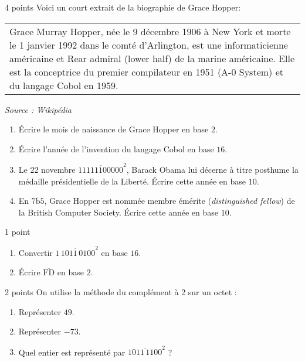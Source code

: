 \documentclass[a4paper,dvipsnames]{article}
\begin{document}
\begin{exercice}{4 points}{}
  Voici un court extrait de la biographie de Grace Hopper:

  \begin{center}
    \begin{tabular}{|p{12cm}}
      Grace Murray Hopper, née le 9 décembre 1906 à New York et morte le 1\ier{} janvier 1992 dans le comté d'Arlington, est une informaticienne américaine et Rear admiral (lower half) de la marine américaine. Elle est la conceptrice du premier compilateur en 1951 (A-0 System) et du langage Cobol en 1959.
    \end{tabular}

    \smallskip

    \begin{minipage}{12cm}
      \flushright\textit{Source : Wikipédia}
    \end{minipage}
  \end{center}

  \begin{enumerate}
    \item Écrire le mois de naissance de Grace Hopper en base $2$.
    \item Écrire l'année de l'invention du langage Cobol en base $16$.
    \item Le 22 novembre $\overline{11111100000}^2$, Barack Obama lui décerne à titre posthume la médaille présidentielle de la Liberté. Écrire cette année en base $10$.
    \item En $\overline{7\text{b}5}$, Grace Hopper est nommée \og{}membre émérite\fg{} (\textit{distinguished fellow}) de la British Computer Society. Écrire  cette année en base $10$.
  \end{enumerate}
\end{exercice}

\medskip

\begin{exercice}{1 point}{}
 \begin{enumerate}
   \item Convertir $\overline{1\,1011\,0100}^2$ en base $16$.
   \item Écrire $\overline{\text{F}\text{D}}$ en base $2$.
 \end{enumerate} 
\end{exercice}

\medskip

\begin{exercice}{2 points}{}
 On utilise la méthode du complément à 2 sur un octet :
 \begin{enumerate}
   \item Représenter $49$.
   \item Représenter $-73$. 
   \item Quel entier est représenté par $\overline{1011\,1100}^2$ ?
 \end{enumerate}
\end{exercice}
\end{document}
